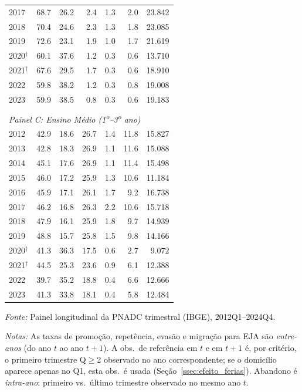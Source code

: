 \begin{table}[htbp]
\begin{threeparttable}
\begin{tabular}{lrrrrrr}
2017 & 68.7 & 26.2 & 2.4 & 1.3 & 2.0 & 23.842 \\
2018 & 70.4 & 24.6 & 2.3 & 1.3 & 1.8 & 23.085 \\
2019 & 72.6 & 23.1 & 1.9 & 1.0 & 1.7 & 21.619 \\
2020$^{\dagger}$ & 60.1 & 37.6 & 1.2 & 0.3 & 0.6 & 13.710 \\
2021$^{\dagger}$ & 67.6 & 29.5 & 1.7 & 0.3 & 0.6 & 18.910 \\
2022 & 59.8 & 38.2 & 1.2 & 0.3 & 0.8 & 19.008 \\
2023 & 59.9 & 38.5 & 0.8 & 0.3 & 0.6 & 19.183 \\
\\[0.3em]
\multicolumn{7}{l}{\textit{Painel C: Ensino M\'edio (1\textsuperscript{o}--3\textsuperscript{o} ano)}} \\
\midrule
2012 & 42.9 & 18.6 & 26.7 & 1.4 & 11.8 & 15.827 \\
2013 & 42.8 & 18.3 & 26.9 & 1.1 & 11.6 & 15.088 \\
2014 & 45.1 & 17.6 & 26.9 & 1.1 & 11.4 & 15.498 \\
2015 & 46.0 & 17.2 & 25.9 & 1.3 & 10.6 & 11.184 \\
2016 & 45.9 & 17.1 & 26.1 & 1.7 & 9.2 & 16.738 \\
2017 & 46.2 & 16.8 & 26.3 & 2.2 & 10.6 & 15.718 \\
2018 & 47.9 & 16.1 & 25.9 & 1.8 & 9.7 & 14.939 \\
2019 & 48.8 & 15.7 & 25.8 & 1.5 & 9.8 & 14.166 \\
2020$^{\dagger}$ & 41.3 & 36.3 & 17.5 & 0.6 & 2.7 & 9.072 \\
2021$^{\dagger}$ & 44.5 & 25.3 & 23.6 & 0.9 & 6.1 & 12.388 \\
2022 & 39.7 & 35.2 & 18.8 & 0.4 & 6.6 & 12.666 \\
2023 & 41.3 & 33.8 & 18.1 & 0.4 & 5.8 & 12.484 \\
\bottomrule
\end{tabular}
\begin{tablenotes}\footnotesize
\item \textit{Fonte:} Painel longitudinal da PNADC trimestral (IBGE), 2012Q1--2024Q4.
\item \textit{Notas:} As taxas de promo\c{c}\~ao, repet\^encia, evas\~ao e migra\c{c}\~ao para EJA s\~ao \emph{entre-anos} (do ano $t$ ao ano $t+1$). A obs.\ de refer\^encia em $t$ e em $t+1$ \'e, por crit\'erio, o primeiro trimestre Q$\geq$2 observado no ano correspondente; se o domic\'ilio aparece apenas no Q1, esta obs.\ \'e usada (Se\c{c}\~ao~\ref{ssec:efeito_ferias}). Abandono \'e \emph{intra-ano}: primeiro vs.\ \'ultimo trimestre observado no mesmo ano $t$.

\end{tablenotes}
\end{threeparttable}
\end{table}
